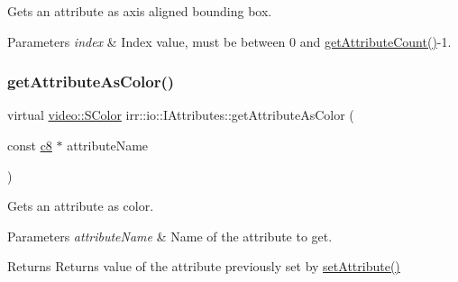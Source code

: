 Gets an attribute as axis aligned bounding box. 


\begin{DoxyParams}{Parameters}
{\em index} & Index value, must be between 0 and \hyperlink{classirr_1_1io_1_1IAttributes_a796bdd9440ee7ba0b6742a90a82870b6}{get\+Attribute\+Count()}-\/1. \\
\hline
\end{DoxyParams}
\mbox{\label{classirr_1_1io_1_1IAttributes_a72b576b9ba7332952cdb86c60dae2fee}} 
\subsubsection{\texorpdfstring{get\+Attribute\+As\+Color()}{getAttributeAsColor()}\hspace{0.1cm}{\footnotesize\ttfamily [1/4]}}
{\footnotesize\ttfamily virtual \hyperlink{classirr_1_1video_1_1SColor}{video\+::\+S\+Color} irr\+::io\+::\+I\+Attributes\+::get\+Attribute\+As\+Color (\begin{DoxyParamCaption}\item[{const \hyperlink{namespaceirr_a9395eaea339bcb546b319e9c96bf7410}{c8} $\ast$}]{attribute\+Name }\end{DoxyParamCaption})\hspace{0.3cm}{\ttfamily [pure virtual]}}



Gets an attribute as color. 


\begin{DoxyParams}{Parameters}
{\em attribute\+Name} & Name of the attribute to get. \\
\hline
\end{DoxyParams}
\begin{DoxyReturn}{Returns}
Returns value of the attribute previously set by \hyperlink{classirr_1_1io_1_1IAttributes_a03fa31acb481ae23678676cc183f09a6}{set\+Attribute()} 
\end{DoxyReturn}
\mbox{\label{classirr_1_1io_1_1IAttributes_a72b576b9ba7332952cdb86c60dae2fee}} 
